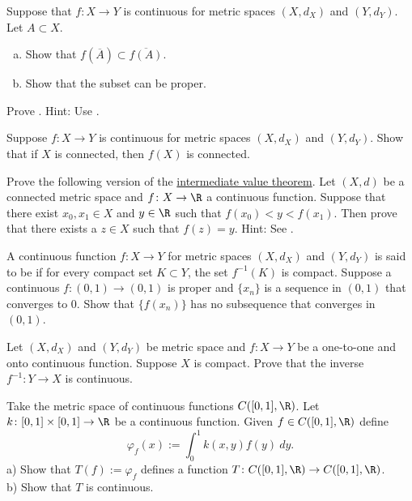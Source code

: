 \documentclass[12pt]{book}
\begin{document}
\begin{exercise} 
Suppose that $f \colon X \to Y$ is continuous for metric spaces $(X,d_X)$ and $(Y,d_Y)$.  
Let $A \subset X$.
\begin{enumerate}[a)]
 \item Show that $f(\overline{A}) \subset
\overline{f(A)}$.
  \item Show that the subset can be proper.
\end{enumerate}
\end{exercise}

\begin{exercise}
Prove .
Hint: Use .
\end{exercise}

\begin{exercise} \label{exercise:msconnconn}
Suppose $f \colon X \to Y$ is continuous for metric spaces $(X,d_X)$
and $(Y,d_Y)$.
Show that if $X$ is connected, then $f(X)$ is connected.
\end{exercise}

\begin{exercise}
Prove the following version of the
\hyperref[IVT:thm]{intermediate value theorem}.
Let $(X,d)$ be a connected
metric space and $f \colon X \to \R$ a continuous function.
Suppose that
there exist $x_0,x_1 \in X$ and $y \in \R$ such that $f(x_0) < y < f(x_1)$.
Then prove that there exists a $z \in X$ such that $f(z) = y$.
Hint: See .
\end{exercise}

\begin{exercise}
A continuous function $f \colon X \to Y$ for metric spaces $(X,d_X)$ and
$(Y,d_Y)$ is said to be \emph{}
if for every compact set $K \subset Y$, the set $f^{-1}(K)$ is compact.
Suppose a continuous $f \colon (0,1) \to (0,1)$ is proper and $\{ x_n
\}$ is a sequence in $(0,1)$ that converges to $0$.
Show that
$\{ f(x_n) \}$ has no subsequence that converges in $(0,1)$.
\end{exercise}

\begin{exercise}
Let $(X,d_X)$ and $(Y,d_Y)$ be metric space and
$f \colon X \to Y$ be a one-to-one and onto continuous function.
Suppose
$X$ is compact.
Prove that the inverse $f^{-1} \colon Y \to X$
is continuous.
\end{exercise}

\begin{exercise}
Take the metric space of continuous functions $C([0,1],\R)$.
Let
$k \colon [0,1] \times [0,1] \to \R$ be a continuous function.
Given $f \in C([0,1],\R)$ define
\begin{equation*}
\varphi_f(x) := \int_0^1 k(x,y) f(y) ~dy .
\end{equation*}
a) Show that $T(f) := \varphi_f$ defines a function $T \colon C([0,1],\R) \to
C([0,1],\R)$.
\\
b) Show that $T$ is continuous.
\end{exercise}
\end{document}
